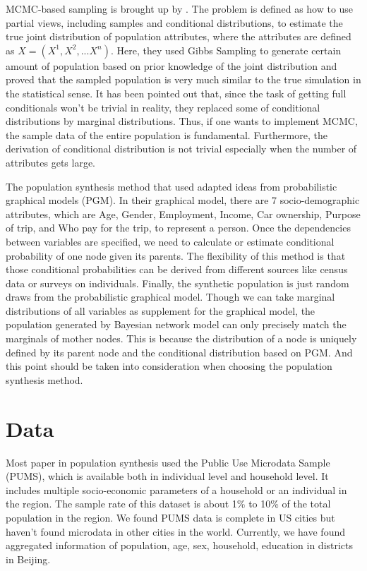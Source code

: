 \documentclass{article}
\begin{document}
MCMC-based sampling is brought up by \textcite{farooq2013simulation}.
The problem is defined as how to use partial views, including samples and conditional distributions, to estimate the true joint distribution of population attributes, where the attributes are defined as $X = (X^1, X^2, ... X^n)$.
Here, they used Gibbs Sampling to generate certain amount of population based on prior knowledge of the joint distribution and proved that the sampled population is very much similar to the true simulation in the statistical sense.
It has been pointed out that, since the task of getting full conditionals won't be trivial in reality, they replaced some of conditional distributions by marginal distributions.
Thus, if one wants to implement MCMC, the sample data of the entire population is fundamental.
Furthermore, the derivation of conditional distribution is not trivial especially when the number of attributes gets large.

The population synthesis method that \textcite{petrik2016measuring} used adapted ideas from probabilistic graphical models (PGM).
In their graphical model, there are 7 socio-demographic attributes, which are Age, Gender, Employment, Income, Car ownership, Purpose of trip, and Who pay for the trip, to represent a person.
Once the dependencies between variables are specified, we need to calculate or estimate conditional probability of one node given its parents.
The flexibility of this method is that those conditional probabilities can be derived from different sources like census data or surveys on individuals.
Finally, the synthetic population is just random draws from the probabilistic graphical model.
Though we can take marginal distributions of all variables as supplement for the graphical model, the population generated by Bayesian network model can only precisely match the marginals of mother nodes.
This is because the distribution of a node is uniquely defined by its parent node and the conditional distribution based on PGM.
And this point should be taken into consideration when choosing the population synthesis method. 


\section{Data}
Most paper in population synthesis used the Public Use Microdata Sample (PUMS), which is available both in individual level and household level.
It includes multiple socio-economic parameters of a household or an individual in the region.
The sample rate of this dataset is about 1\% to 10\% of the total population in the region.
We found PUMS data is complete in US cities but haven't found microdata in other cities in the world.
Currently, we have found aggregated information of population, age, sex, household, education in districts in Beijing.
\end{document}
